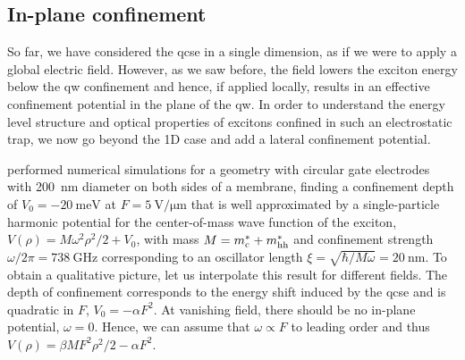 \subsection{In-plane confinement}\label{subsec:exp:theory:qcse:trap}
So far, we have considered the \gls{qcse} in a single dimension, as if we were to apply a global electric field.
However, as we saw before, the field lowers the exciton energy below the \gls{qw} confinement and hence, if applied locally, results in an effective confinement potential in the plane of the \gls{qw}.
In order to understand the energy level structure and optical properties of excitons confined in such an electrostatic trap, we now go beyond the 1D case and add a lateral confinement potential.

\textcite{Descamps2021} performed numerical simulations for a geometry with circular gate electrodes with \qty{200}{\nano\meter} diameter on both sides of a membrane, finding a confinement depth of $V_0 = -\qty{20}{\milli\electronvolt}$ at $F=\qty{5}{\volt\per\micro\meter}$ that is well approximated by a single-particle harmonic potential for the center-of-mass wave function of the exciton, $V(\rho) = M\omega^{2}\rho^{2}/2 + V_0$, with mass $M = m^\ast_{\mathrm{c}} + m^\ast_{\mathrm{hh}}$ and confinement strength $\omega/2\pi = \qty{738}{\giga\hertz}$ corresponding to an oscillator length $\xi=\sqrt{\hbar/M\omega}=\qty{20}{\nano\meter}$.
To obtain a qualitative picture, let us interpolate this result for different fields.
The depth of confinement corresponds to the energy shift induced by the \gls{qcse} and is quadratic in $F$, $V_0 = -\alpha F^2$.
At vanishing field, there should be no in-plane potential, $\omega=0$.
Hence, we can assume that $\omega\propto F$ to leading order and thus $V(\rho) = \beta M F^{2} \rho^{2}/2 - \alpha F^{2}$.

